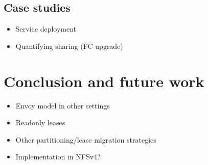 \documentclass[a4paper,12pt]{article}
\begin{document}
\subsection{Case studies}
\begin{itemize}
\item Service deployment
\item Quantifying sharing (FC upgrade)
\end{itemize}


\section{Conclusion and future work}
\begin{itemize}
\item Envoy model in other settings
\item Readonly leases
\item Other partitioning/lease migration strategies
\item Implementation in NFSv4?
\end{itemize}

\nocite{*}

\end{document}
